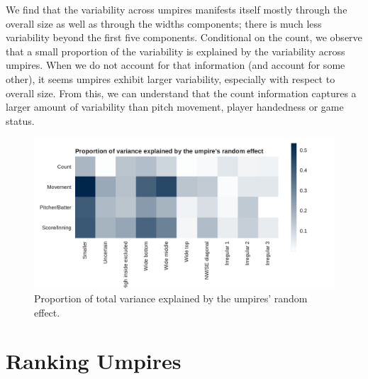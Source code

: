 \documentclass[letterpaper,12pt]{article}
\begin{document}
We find that the variability across umpires manifests itself mostly through the overall size as well as through the widths components; there is much less variability beyond the first five components.
Conditional on the count, we observe that a small proportion of the variability is explained by the variability across umpires. 
When we do not account for that information (and account for some other), it seems umpires exhibit larger variability, especially with respect to overall size.
From this, we can understand that the count information captures a larger amount of variability than pitch movement, player handedness or game status.

\begin{figure}
    \centering
    \includegraphics[scale=0.75]{fig/lmm_pct_var.pdf}
    \caption{Proportion of total variance explained by the umpires' random effect.}
    \label{fig:lmm_pct_var}
\end{figure}

\section{Ranking Umpires}\label{sec:ranking}
\end{document}
